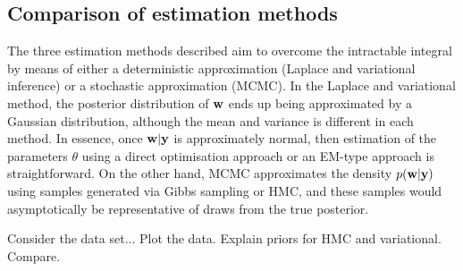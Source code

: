 
\subsection{Comparison of estimation methods}


The three estimation methods described aim to overcome the intractable integral by means of either a deterministic approximation (Laplace and variational inference) or a stochastic approximation (MCMC).
In the Laplace and variational method, the posterior distribution of ${\mathbf w}$ ends up being approximated by a Gaussian distribution, although the mean and variance is different in each method.
In essence, once ${\mathbf w}|{\mathbf y}$ is approximately normal, then estimation of the parameters $\theta$ using a direct optimisation approach or an EM-type approach is straightforward.
On the other hand, MCMC approximates the density $p({\mathbf w}|{\mathbf y})$ using samples generated via Gibbs sampling or HMC, and these samples would asymptotically be representative of draws from the true posterior.

Consider the data set...
Plot the data. Explain priors for HMC and variational. Compare.




